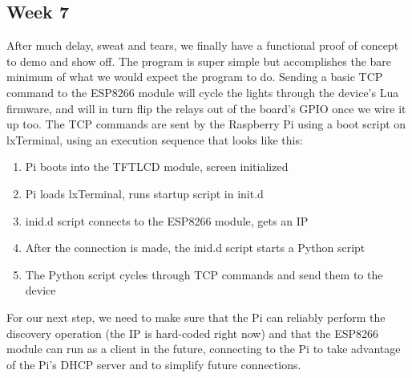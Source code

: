 \documentclass[letterpaper,10pt]{article}
\begin{document}
\subsection{Week 7}  

After much delay, sweat and tears, we finally have a functional proof 
of concept to demo and show off. The program is super simple but 
accomplishes the bare minimum of what we would expect the program to do.
Sending a basic TCP command to the ESP8266 module will cycle the lights 
through the device's Lua firmware, and will in turn flip the relays out of
the board's GPIO once we wire it up too. The TCP commands are sent by the 
Raspberry Pi using a boot script on lxTerminal, using an execution sequence
that looks like this:

\begin{enumerate}
    \item Pi boots into the TFTLCD module, screen initialized
    \item Pi loads lxTerminal, runs startup script in init.d
    \item inid.d script connects to the ESP8266 module, gets an IP
    \item After the connection is made, the inid.d script starts a Python
        script
    \item The Python script cycles through TCP commands and send them to the
        device
\end{enumerate}

For our next step, we need to make sure that the Pi can reliably perform the
discovery operation (the IP is hard-coded right now) and that the ESP8266
module can run as a client in the future, connecting to the Pi to take
advantage of the Pi's DHCP server and to simplify future connections.\\
\end{document}
